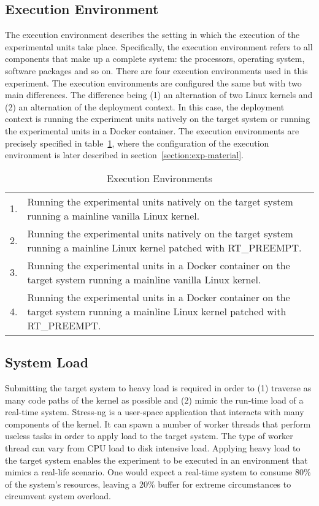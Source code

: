\subsection{Execution Environment}
The execution environment describes the setting in which the execution of the experimental units take place. Specifically, the execution environment refers to all components that make up a complete system: the processors, operating system, software packages and so on. There are four execution environments used in this experiment. The execution environments are configured the same but with two main differences. The difference being (1) an alternation of two Linux kernels and (2) an alternation of the deployment context. In this case, the deployment context is running the experiment units natively on the target system or running the experimental units in a Docker container. The execution environments are precisely specified in table~\ref{table:exe-env}, where the configuration of the execution environment is later described in section~\ref{section:exp-material}.


\begin{table}[ht]
\begin{tabular}{l|p{14cm}}
1. & Running the experimental units natively on the target system running a mainline vanilla Linux kernel.                               \\
2. & Running the experimental units natively on the target system running a mainline Linux kernel patched with RT\_PREEMPT.              \\
3. & Running the experimental units in a Docker container on the target system running a mainline vanilla Linux kernel.                  \\
4. & Running the experimental units in a Docker container on the target system running a mainline Linux kernel patched with RT\_PREEMPT.
\end{tabular}
\centering
\caption{Execution Environments}
\label{table:exe-env}
\end{table}


\subsection{System Load}
Submitting the target system to heavy load is required in order to (1) traverse as many code paths of the kernel as possible and (2) mimic the run-time load of a real-time system. Stress-ng \cite{stress-ng} is a user-space application that interacts with many components of the kernel. It can spawn a number of worker threads that perform useless tasks in order to apply load to the target system. The type of worker thread can vary from CPU load to disk intensive load. Applying heavy load to the target system enables the experiment to be executed in an environment that mimics a real-life scenario. One would expect a real-time system to consume 80\% of the system's resources, leaving a 20\% buffer for extreme circumstances to circumvent system overload. \\

